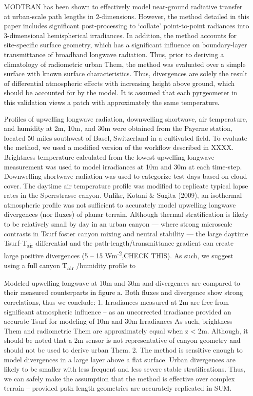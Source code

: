 MODTRAN has been shown to effectively model near-ground radiative transfer at urban-scale path lengths in 2-dimensions. However, the method detailed in this paper includes significant post-processing to ‘collate’ point-to-point radiances into 3-dimensional hemispherical irradiances. In addition, the method accounts for site-specific surface geometry, which has a significant influence on boundary-layer transmittance of broadband longwave radiation. Thus, prior to deriving a climatology of radiometric urban Them, the method was evaluated over a simple surface with known surface characteristics. Thus, divergences are solely the result of differential atmospheric effects with increasing height above ground, which should be accounted for by the model. It is assumed that each pyrgeometer in this validation views a patch with approximately the same temperature. 

Profiles of upwelling longwave radiation, downwelling shortwave, air temperature, and humidity at 2m, 10m, and 30m were obtained from the Payerne station, located 50 miles southwest of Basel, Switzerland in a cultivated field. To evaluate the method, we used a modified version of the workflow described in XXXX. Brightness temperature calculated from the lowest upwelling longwave measurement was used to model irradiances at 10m and 30m at each time-step. Downwelling shortwave radiation was used to categorize test days based on cloud cover. The daytime air temperature profile was modified to replicate typical lapse rates in the Sperrstrasse canyon. Unlike, Kotani \& Sugita (2009), an isothermal atmospheric profile was not sufficient to accurately model upwelling longwave divergences (nor fluxes) of planar terrain. Although thermal stratification is likely to be relatively small by day in an urban canyon \cite{Nakamura1988} --- where strong microscale contrasts in Tsurf foster canyon mixing and neutral stability --- the large daytime Tsurf-T\textsubscript{air}  differential and the path-length/transmittance gradient can create large positive divergences (5 – 15 Wm\textsuperscript{-2},CHECK THIS). As such, we suggest using a full canyon T\textsubscript{air} /humidity profile to 

Modeled upwelling longwave at 10m and 30m and divergences are compared to their measured counterparts in figure a. Both fluxes and divergence show strong correlations, thus we conclude: 1. Irradiances measured at 2m are free from significant atmospheric influence – as an uncorrected irradiance provided an accurate Tsurf for modeling of 10m and 30m Irradiances As such, brightness Them and radiometric Them are approximately equal when z < 2m. Although, it should be noted that a 2m sensor is not representative of canyon geometry and should not be used to derive urban Them. 2. The method is sensitive enough to model divergences in a large layer above a flat surface. Urban divergences are likely to be smaller with less frequent and less severe stable stratifications. Thus, we can safely make the assumption that the method is effective over complex terrain – provided path length geometries are accurately replicated in SUM.


